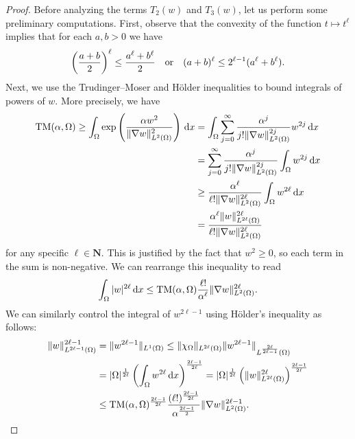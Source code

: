 \documentclass[reqno,11pt]{amsart}
\theoremstyle{definition}
\newcommand{\ud}{\,\mathrm{d}}
\begin{document}
\begin{proof}
Before analyzing the terms $T_2(w)$ and $T_3(w)$,
let us perform some preliminary computations. 
First, observe that the convexity of the function $t \mapsto t^\ell$ implies that 
for each $a,b >0$ we have 
\begin{equation}\label{convex_power}
\left ( \frac{a + b}{2} \right )^\ell \leq \frac{a^\ell + b^\ell}{2} \quad {\rm or} \quad
(a+b)^\ell \leq 2^{\ell-1} (a^\ell + b^\ell ).
\end{equation} 
Next, we use the Trudinger--Moser and H\"older 
inequalities to bound integrals of powers of $w$. 
More precisely, we have 
    \begin{align*} 
    {\rm TM}(\alpha,\Omega) \geq \int_\Omega \exp \left (\frac{\alpha w^2}{\| \nabla w\|_{L^2(\Omega)}^2} \right ) \ud x 
    & = \int_\Omega \sum_{j = 0}^\infty \frac{\alpha^j}{j ! 
    \| \nabla w \|_{L^2(\Omega)}^{2j} }w^{2j}\ud x\\
    &= \sum_{j = 0}^\infty \frac{\alpha^j}
    {j ! \| \nabla w\|_{L^2(\Omega)}^{2j}} 
    \int_\Omega w^{2j} \ud x \\ 
    & \geq \frac{\alpha^\ell}{\ell! \| \nabla w \|_{L^2(\Omega)} ^{2\ell}} 
    \int_\Omega w^{2\ell} \ud x\\
    &= \frac{\alpha^{\ell} \| w\|_{L^{2\ell}(\Omega)}^{2\ell}}
    {\ell! \| \nabla w\|_{L^2(\Omega)}^{2\ell} }
    \end{align*} 
    for any specific $\ell \in \mathbf{N}$. This is justified by the fact that $w^2 \geq 0$, 
    so each term in the sum is non-negative. We can rearrange this inequality to read 
    \begin{equation} \label{higher_order1}
    \int_\Omega |w|^{2\ell}\ud x \leq {\rm TM}(\alpha,\Omega)\frac{\ell!}{\alpha^\ell}
    \| \nabla w \|_{L^2(\Omega)}^{2\ell} . \end{equation}
    We can similarly control the integral of $w^{2\ell-1}$ using H\"older's inequality as follows: 
  \begin{align} \label{higher_order2} 
    \| w \|_{L^{2\ell-1}(\Omega)}^{2\ell -1} & =  \| w^{2\ell -1} \|_{L^1(\Omega)}    \leq \| \chi_{\Omega} \|_{L^{2\ell}(\Omega)} 
    \| w^{2\ell -1} \|_{L^{\frac{2\ell}{2\ell-1}}(\Omega)} \\ \nonumber 
    & = |\Omega|^{\frac{1}{2\ell}} \left ( \int_\Omega w^{2\ell} \ud x\right )^{\frac{2\ell-1}{2\ell}} 
    = |\Omega|^{\frac{1}{2\ell}} \left ( 
    \| w \|_{L^{2\ell}(\Omega)}^{2\ell} \right )^{\frac{2\ell-1}{2\ell}} \\ \nonumber 
    & \leq {\rm TM}(\alpha,\Omega)^{\frac{2\ell-1}{2\ell}} \frac{(\ell !)^{\frac{2\ell-1}{2\ell}}}
    {\alpha^{\frac{2\ell-1}{2}}} \| \nabla w\|_{L^2(\Omega)}^{2\ell -1}.
    \end{align} 


\end{proof}
\end{document}
